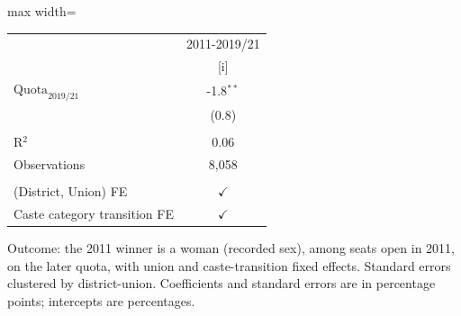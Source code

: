 
\begingroup
\centering
\scriptsize
\begin{adjustbox}{max width=\linewidth}
   \begin{threeparttable}[b]
      \begin{tabular}{lc}
         \toprule
                                      & 2011-2019/21 \\
                                      & [i]\\
         \midrule
         $\text{Quota}_{2019/21}$     & -1.8$^{**}$\\
                                      & (0.8)\\
          \\
         R$^2$                        & 0.06\\
         Observations                 & 8,058\\
          \\
         (District, Union) FE         & $\checkmark$\\
         Caste category transition FE & $\checkmark$\\
         \bottomrule
      \end{tabular}

      \begin{tablenotes}
         \item Outcome: the 2011 winner is a woman (recorded sex), among seats open in 2011, on the later quota, with union and caste-transition fixed effects. Standard errors clustered by district-union. Coefficients and standard errors are in percentage points; intercepts are percentages.
      \end{tablenotes}
   \end{threeparttable}
\end{adjustbox}
\par\endgroup


